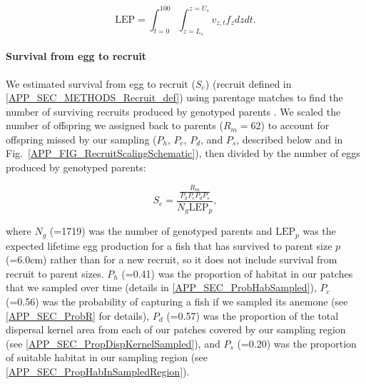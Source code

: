 \documentclass[12pt, oneside]{article}   	%
\begin{document}
\begin{equation}
\text{LEP} = \int_{t=0}^{100}\int_{z=L_s}^{z=U_s} v_{z,t} f_z dz dt. \label{EQN_LEP}
\end{equation}

\paragraph*{Survival from egg to recruit}

We estimated survival from egg to recruit ($S_e$) (recruit defined in \ref{APP_SEC_METHODS_Recruit_def}) using parentage matches to find the number of surviving recruits produced by genotyped parents \citep[similar to][]{johnson2018integrating}. We scaled the number of offspring we assigned back to parents ($R_m = 62$) to account for offspring missed by our sampling ($P_h$, $P_c$, $P_d$, and $P_s$, described below and in Fig.\ \ref{APP_FIG_RecruitScalingSchematic}), then divided by the number of eggs produced by genotyped parents:

\begin{equation}
S_e = \frac{\frac{R_m}{P_h P_c P_d P_s}}{N_g \text{LEP}_p}, \label{EQN_EggRecruitSurv}
\end{equation}

where $N_g$ (=1719) was the number of genotyped parents and $\text{LEP}_p$ was the expected lifetime egg production for a fish that has survived to parent size $p$ (=6.0cm) rather than for a new recruit, so it does not include survival from recruit to parent sizes. $P_h$ (=0.41) was the proportion of habitat in our patches that we sampled over time (details in \ref{APP_SEC_ProbHabSampled}), $P_c$ (=0.56) was the probability of capturing a fish if we sampled its anemone (see \ref{APP_SEC_ProbR} for details), $P_d$ (=0.57) was the proportion of the total dispersal kernel area from each of our patches covered by our sampling region (see \ref{APP_SEC_PropDispKernelSampled}), and $P_s$ (=0.20) was the proportion of suitable habitat in our sampling region (see \ref{APP_SEC_PropHabInSampledRegion}).
\end{document}
